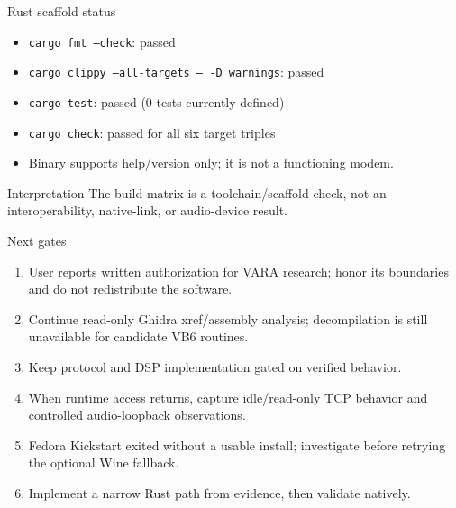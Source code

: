 \documentclass[20pt]{beamer}
\begin{document}
\begin{frame}{Rust scaffold status}
  \begin{itemize}
    \item \texttt{cargo fmt --check}: passed
    \item \texttt{cargo clippy --all-targets -- -D warnings}: passed
    \item \texttt{cargo test}: passed (0 tests currently defined)
    \item \texttt{cargo check}: passed for all six target triples
    \item Binary supports help/version only; it is not a functioning modem.
  \end{itemize}
  \begin{block}{Interpretation}
    The build matrix is a toolchain/scaffold check, not an interoperability,
    native-link, or audio-device result.
  \end{block}
\end{frame}

\begin{frame}{Next gates}
  \begin{enumerate}
    \item User reports written authorization for VARA research; honor its
          boundaries and do not redistribute the software.
    \item Continue read-only Ghidra xref/assembly analysis; decompilation is
          still unavailable for candidate VB6 routines.
    \item Keep protocol and DSP implementation gated on verified behavior.
    \item When runtime access returns, capture idle/read-only TCP behavior and
          controlled audio-loopback observations.
    \item Fedora Kickstart exited without a usable install; investigate before
          retrying the optional Wine fallback.
    \item Implement a narrow Rust path from evidence, then validate natively.
  \end{enumerate}
\end{frame}
\end{document}
